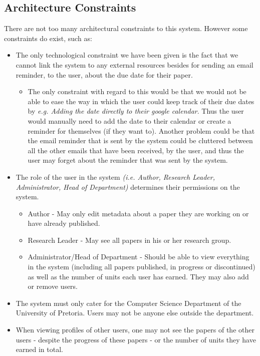 \documentclass[a4paper,12pt]{article}
\begin{document}
\subsection{Architecture Constraints}

There are not too many architectural constraints to this system. However some constraints do exist, such as:
\begin{itemize}
\item The only technological constraint we have been given is the fact that we cannot link the system to any external resources besides for sending an email reminder, to the user, about the due date for their paper.
	\begin{itemize}
	\item The only constraint with regard to this would be that we would not be able to ease the way in which the user could keep track of their due dates by \textit{e.g. Adding the date directly to their google calendar}. Thus the user would manually need to add the date to their calendar or create a reminder for themselves (if they want to). Another problem could be that the email reminder that is sent by the system could be cluttered between all the other emails that have been received, by the user, and thus the user may forget about the reminder that was sent by the system. 
	\end{itemize}
\item The role of the user in the system \textit{(i.e. Author, Research Leader, Administrator, Head of Department)} determines their permissions on the system.
	\begin{itemize}
	\item Author - May only edit metadata about a paper they are working on or have already published.
	\item Research Leader - May see all papers in his or her research group.
	\item Administrator/Head of Department - Should be able to view everything in the system (including all papers published, in progress or discontinued) as well as the number of units each user has earned. They may also add or remove users.
	\end{itemize}
\item The system must only cater for the Computer Science Department of the University of Pretoria. Users may not be anyone else outside the department. 
\item When viewing profiles of other users, one may not see the papers of the other users - despite the progress of these papers - or the number of units they have earned in total. 

\end{itemize}
\end{document}
